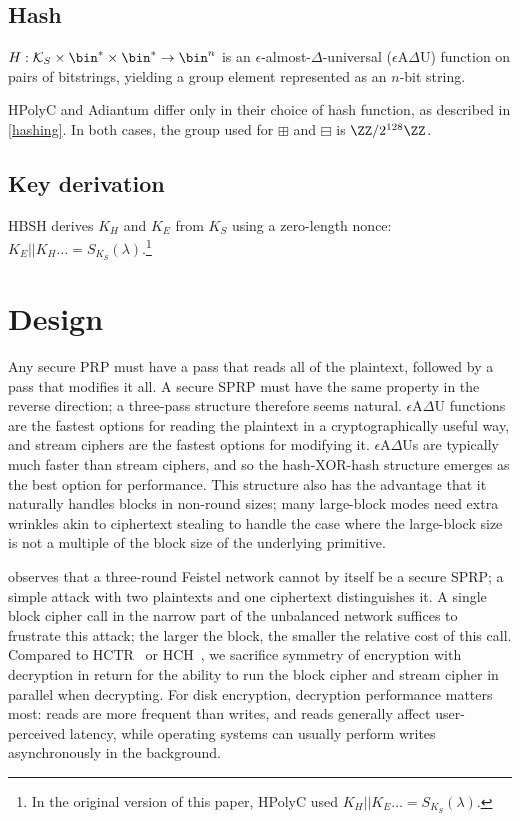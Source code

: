 \documentclass[journal=tosc,preprint,floatrow,submission]{iacrtrans}
\begin{document}
\subsection{Hash}
$H: \mathcal{K}_S \times \bin^{*} \times \bin^{*} \rightarrow \bin^n$
is an $\epsilon$-almost-$\Delta$-universal ($\epsilon$A$\Delta$U) function on pairs
of bitstrings, yielding a group element represented as an $n$-bit string.

HPolyC and Adiantum differ only in their choice of hash function, as described in \autoref{hashing}.
In both cases, the group used for
$\boxplus$ and $\boxminus$ is $\ZZ/2^{128}\ZZ$.

\subsection{Key derivation}\label{keyderivation}
HBSH derives $K_H$ and $K_E$ from $K_S$ using a zero-length nonce:
$K_E || K_H \ldots = S_{K_S}(\lambda)$.\footnote{In the original
version of this paper, HPolyC used $K_H || K_E \ldots = S_{K_S}(\lambda)$.}

\section{Design}
Any secure PRP must have a pass that reads all of the plaintext, followed by a pass that modifies
it all. A secure SPRP must have the same property in the reverse direction;
a three-pass structure therefore seems natural.
$\epsilon$A$\Delta$U functions are the fastest options for reading the plaintext in a
cryptographically useful way, and stream ciphers are the fastest options for modifying it.
$\epsilon$A$\Delta$Us
are typically much faster than stream ciphers, and so the hash-XOR-hash structure emerges as
the best option for performance. This structure also has the advantage that it naturally handles
blocks in non-round sizes; many large-block modes need extra wrinkles akin to ciphertext stealing
to handle the case where the large-block size is not
a multiple of the block size of the underlying primitive.

\cite{luby-rackoff} observes that a three-round Feistel network cannot by itself be a secure SPRP;
a simple attack with two plaintexts and one ciphertext distinguishes it. A single block cipher call
in the narrow part of the unbalanced network suffices to frustrate this attack; the
larger the block, the smaller the relative cost of this call.
Compared to HCTR~\cite{hctr} or HCH~\cite{hch}, we sacrifice
symmetry of encryption with decryption in return for
the ability to run the block cipher and stream cipher in parallel when decrypting.
For disk encryption, decryption performance matters most:
reads are more frequent than writes, and reads generally affect user-perceived latency, while
operating systems can usually perform writes asynchronously in the background.
\end{document}
